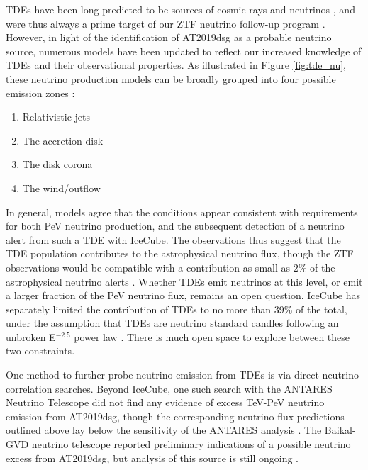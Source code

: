 \documentclass[a4paper,11pt]{article}
\begin{document}
TDEs have been long-predicted to be sources of cosmic rays and neutrinos \cite{farrar_09, farrar_14, dai_17, senno_17, Biehl_tde_uhecr, guepin_18, hayasaki_19, winter_bran_21, winter_icrc_21, murase_tde_20, liu21_bran}, and were thus always a prime target of our ZTF neutrino follow-up program \cite{ztf_19_science}. However, in light of the identification of AT2019dsg as a probable neutrino source, numerous models have been updated to reflect our increased knowledge of TDEs and their observational properties. As illustrated in Figure \ref{fig:tde_nu}, these neutrino production models can be broadly grouped into four possible emission zones \cite{hayasaki_21}:

\begin{enumerate}[i]
	\item Relativistic jets \cite{winter_bran_21, winter_icrc_21, liu21_bran}
	\item The accretion disk \cite{hayasaki_19}
	\item The disk corona \cite{murase_tde_20}
	\item The wind/outflow \cite{murase_tde_20}
\end{enumerate}

In general, models agree that the conditions appear consistent with requirements for both PeV neutrino production, and the subsequent detection of a neutrino alert from such a TDE with IceCube. The observations thus suggest that the TDE population contributes to the astrophysical neutrino flux, though the ZTF observations would be compatible with a contribution as small as $2$\% of the astrophysical neutrino alerts \cite{bran}. Whether TDEs emit neutrinos at this level, or emit a larger fraction of the PeV neutrino flux, remains an open question. IceCube has separately limited the contribution of TDEs to no more than 39\% of the total, under the assumption that TDEs are neutrino standard candles following an unbroken E$^{-2.5}$ power law \cite{stein_19}. There is much open space to explore between these two constraints.

One method to further probe neutrino emission from TDEs is via direct neutrino correlation searches. Beyond IceCube, one such search with the ANTARES Neutrino Telescope did not find any evidence of excess TeV-PeV neutrino emission from AT2019dsg, though the corresponding neutrino flux predictions outlined above lay below the sensitivity of the ANTARES analysis \cite{antares_tde_21, illuminati_21}. The Baikal-GVD neutrino telescope reported preliminary indications of a possible neutrino excess from AT2019dsg, but analysis of this source is still ongoing \cite{baikail_tde_21}. 
\end{document}
